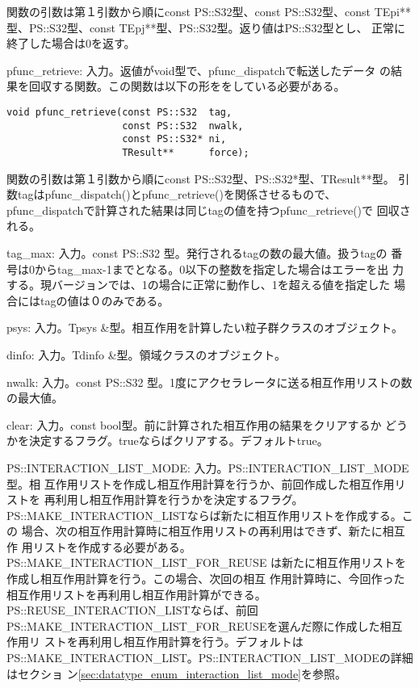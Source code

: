 \begin{itemize}
関数の引数は第１引数から順にconst PS::S32型、const PS::S32型、const
TEpi**型、PS::S32型、const TEpj**型、PS::S32型。返り値はPS::S32型とし、
正常に終了した場合は0を返す。

pfunc\_retrieve: 入力。返値がvoid型で、pfunc\_dispatchで転送したデータ
の結果を回収する関数。この関数は以下の形ををしている必要がある。

\begin{verbatim}
void pfunc_retrieve(const PS::S32  tag,
                    const PS::S32  nwalk,
                    const PS::S32* ni,
                    TResult**      force);
\end{verbatim}

関数の引数は第１引数から順にconst PS::S32型、PS::S32*型、TResult**型。
引数tagはpfunc\_dispatch()とpfunc\_retrieve()を関係させるもので、
pfunc\_dispatchで計算された結果は同じtagの値を持つpfunc\_retrieve()で
回収される。

tag\_max: 入力。const PS::S32 型。発行されるtagの数の最大値。扱うtagの
番号は0からtag\_max-1までとなる。0以下の整数を指定した場合はエラーを出
力する。現バージョンでは、1の場合に正常に動作し、1を超える値を指定した
場合にはtagの値は０のみである。

psys: 入力。Tpsys \&型。相互作用を計算したい粒子群クラスのオブジェクト。

dinfo: 入力。Tdinfo \&型。領域クラスのオブジェクト。

nwalk: 入力。const PS::S32 型。1度にアクセラレータに送る相互作用リストの数の最大値。

clear: 入力。const bool型。前に計算された相互作用の結果をクリアするか
どうかを決定するフラグ。trueならばクリアする。デフォルトtrue。

PS::INTERACTION\_LIST\_MODE: 入力。PS::INTERACTION\_LIST\_MODE 型。相
互作用リストを作成し相互作用計算を行うか、前回作成した相互作用リストを
再利用し相互作用計算を行うかを決定するフラグ。
PS::MAKE\_INTERACTION\_LISTならば新たに相互作用リストを作成する。この
場合、次の相互作用計算時に相互作用リストの再利用はできず、新たに相互作
用リストを作成する必要がある。PS::MAKE\_INTERACTION\_LIST\_FOR\_REUSE
は新たに相互作用リストを作成し相互作用計算を行う。この場合、次回の相互
作用計算時に、今回作った相互作用リストを再利用し相互作用計算ができる。
PS::REUSE\_INTERACTION\_LISTならば、前回
PS::MAKE\_INTERACTION\_LIST\_FOR\_REUSEを選んだ際に作成した相互作用リ
ストを再利用し相互作用計算を行う。デフォルトは
PS::MAKE\_INTERACTION\_LIST。PS::INTERACTION\_LIST\_MODEの詳細はセクショ
ン\ref{sec:datatype_enum_interaction_list_mode}を参照。


\end{itemize}
